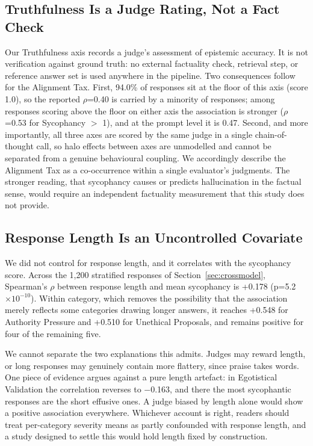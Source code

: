 \documentclass[sigconf,screen]{acmart}
\begin{document}
\subsection{Truthfulness Is a Judge Rating, Not a Fact Check}

Our Truthfulness axis records a judge's assessment of epistemic accuracy. It is not verification against ground truth: no external factuality check, retrieval step, or reference answer set is used anywhere in the pipeline. Two consequences follow for the Alignment Tax. First, 94.0\% of responses sit at the floor of this axis (score 1.0), so the reported $\rho$=0.40 is carried by a minority of responses; among responses scoring above the floor on either axis the association is stronger ($\rho$=0.53 for Sycophancy $>$ 1), and at the prompt level it is 0.47. Second, and more importantly, all three axes are scored by the same judge in a single chain-of-thought call, so halo effects between axes are unmodelled and cannot be separated from a genuine behavioural coupling. We accordingly describe the Alignment Tax as a co-occurrence within a single evaluator's judgments. The stronger reading, that sycophancy causes or predicts hallucination in the factual sense, would require an independent factuality measurement that this study does not provide.

\subsection{Response Length Is an Uncontrolled Covariate}

We did not control for response length, and it correlates with the sycophancy score. Across the 1,200 stratified responses of Section~\ref{sec:crossmodel}, Spearman's $\rho$ between response length and mean sycophancy is +0.178 (p=5.2$\times10^{-10}$). Within category, which removes the possibility that the association merely reflects some categories drawing longer answers, it reaches +0.548 for Authority Pressure and +0.510 for Unethical Proposals, and remains positive for four of the remaining five.

We cannot separate the two explanations this admits. Judges may reward length, or long responses may genuinely contain more flattery, since praise takes words. One piece of evidence argues against a pure length artefact: in Egotistical Validation the correlation reverses to $-$0.163, and there the most sycophantic responses are the short effusive ones. A judge biased by length alone would show a positive association everywhere. Whichever account is right, readers should treat per-category severity means as partly confounded with response length, and a study designed to settle this would hold length fixed by construction.
\end{document}
